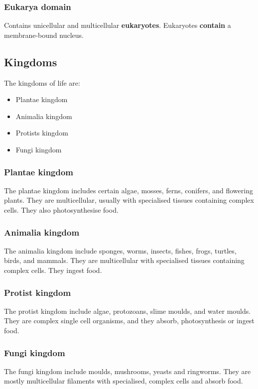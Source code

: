 \documentclass[11pt]{article}
\begin{document}
\subsubsection{Eukarya domain}
\label{sec:org4ee6c28}
Contains unicellular and multicellular \textbf{eukaryotes}. Eukaryotes \textbf{contain} a membrane-bound nucleus.

\subsection{Kingdoms}
\label{sec:orgf1fbd83}
The kingdoms of life are:
\begin{itemize}
\item Plantae kingdom
\item Animalia kingdom
\item Protists kingdom
\item Fungi kingdom
\end{itemize}

\subsubsection{Plantae kingdom}
\label{sec:orga23e2cb}
The plantae kingdom includes certain algae, mosses, ferns, conifers, and flowering plants. They are multicellular, usually with specialised tissues containing complex cells. They also photosynthesise food.

\subsubsection{Animalia kingdom}
\label{sec:org903a73f}
The animalia kingdom include sponges, worms, insects, fishes, frogs, turtles, birds, and mammals. They are multicellular with specialised tissues containing complex cells. They ingest food.

\subsubsection{Protist kingdom}
\label{sec:orgc468233}
The protist kingdom include algae, protozoans, slime moulds, and water moulds. They are complex single cell organisms, and they absorb, photosynthesis or ingest food.

\subsubsection{Fungi kingdom}
\label{sec:orgc7e5568}
The fungi kingdom include moulds, mushrooms, yeasts and ringworms. They are mostly multicellular filaments with specialised, complex cells and absorb food.
\end{document}
